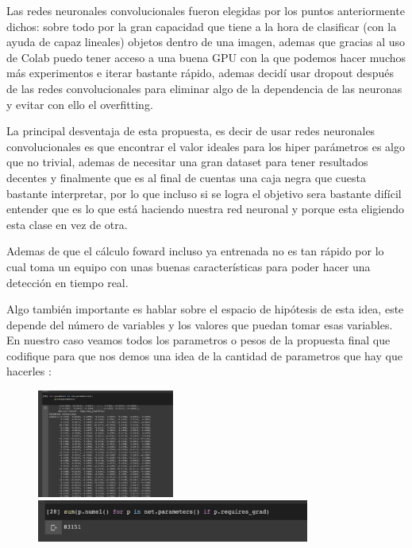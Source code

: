 \documentclass[12pt, fleqn]{report}                             %
\newcommand \Quote              {\qq}                           %
\theoremstyle{break}                                            %
\begin{document}
        Las redes neuronales convolucionales fueron elegidas por los puntos anteriormente dichos:
        sobre todo por la gran capacidad que tiene a la hora de clasificar (con la ayuda de capaz lineales) objetos dentro
        de una imagen, ademas que gracias al uso de Colab puedo tener acceso a una buena GPU con la que podemos hacer
        muchos más experimentos e iterar bastante rápido, ademas decidí usar dropout después de las redes convolucionales para
        eliminar algo de la dependencia de las neuronas y evitar con ello el overfitting.
        
        La principal desventaja de esta propuesta, es decir de usar redes neuronales convolucionales es que
        encontrar el valor ideales para los hiper parámetros es algo que no trivial,
        ademas de necesitar una gran dataset para tener resultados decentes y finalmente que es al final de cuentas una caja negra
        que cuesta bastante interpretar, por lo que incluso si se logra el objetivo sera bastante difícil entender que es lo que
        está haciendo nuestra red neuronal y porque esta eligiendo esta clase en vez de otra.
        
        Ademas de que el cálculo foward incluso ya entrenada no es tan rápido por lo cual toma un equipo con unas buenas características
        para poder hacer una detección en tiempo real.

        \clearpage
        Algo también importante es hablar sobre el espacio de hipótesis de esta idea, este
        depende del número de variables y los valores que puedan tomar esas variables.
        En nuestro caso veamos todos los parametros o pesos de la propuesta final que codifique para que nos demos una idea de la cantidad
        de parametros que hay que hacerles \Quote{fine tunning}:

        \begin{figure}[h!]
            \includegraphics[width=0.4\textwidth]{a}

            \includegraphics[width=0.8\textwidth]{b}
        \end{figure}
\end{document}
